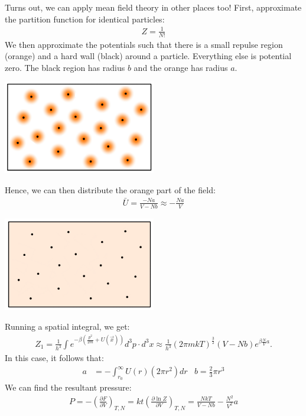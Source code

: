 \documentclass{article}
\begin{document}
 Turns out, we can apply mean field theory in other places too! First, approximate the partition function for identical particles:
\begin{align*}
  Z = \frac{1}{N!}
\end{align*}
We then approximate the potentials such that there is a small repulse region (orange) and a hard wall (black) around a particle. Everything else is potential zero. The black region has radius $b$ and the orange has radius $a$.
\begin{center}
  \includegraphics[width=0.5\textwidth]{images/mean_field_gas.png}
\end{center}
Hence, we can then distribute the orange part of the field:
\begin{align*}
  \bar{U} = \frac{-Na}{V-Nb} \approx -\frac{Na}{V}
\end{align*}
\begin{center}
  \includegraphics[width=0.5\textwidth]{images/mean_field_smush.png}
\end{center}
Running a spatial integral, we get:
\begin{align*}
  Z_1 = \frac{1}{h^3}\int e^{-\beta \left(\frac{p^2}{2m} + U(\vec{x})\right)} d^3p \cdot d^3x \approx \frac{1}{h^3}(2\pi mkT)^\frac{3}{2}(V - Nb)e^{\beta \frac{N}{V} a}.
\end{align*}
In this case, it follows that:
\begin{align*}
  a &= - \int_{r_0}^{\infty} U(r)(2\pi r^2)dr & b = \frac{2}{3}\pi r^3
\end{align*}
We can find the resultant pressure:
\begin{align*}
  P = - \left(\frac{\partial F}{\partial V}\right)_{T, N} = kt \left(\frac{\partial \ln Z}{\partial V}\right)_{T, N} = \frac{NkT}{V-Nb} - \frac{N^2}{V^2}a
\end{align*}
\end{document}
